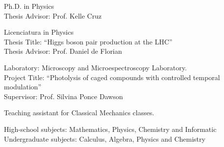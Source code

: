 \documentclass[10pt]{cv}
\begin{document}
\begin{llist}

Ph.D. in Physics\\
Thesis Advisor: Prof. Kelle Cruz

Licenciatura in Physics\\
Thesis Title: ``Higgs boson pair production at the LHC''\\
Thesis Advisor: Prof. Daniel de Florian

Laboratory: Microscopy and Microespectroscopy Laboratory. \\
Project Title: ``Photolysis of caged compounds with controlled temporal modulation'' \\
Supervisor: Prof. Silvina Ponce Dawson



Teaching assistant for Classical Mechanics classes.

High-school subjects: Mathematics, Physics, Chemistry and Informatic \\
Undergraduate subjects: Calculus, Algebra, Physics and Chemistry


\renewcommand{\labelenumi}{B\theenumi}
\begin{etaremune}[leftmargin=10pt]


\end{etaremune}
\end{llist}
\end{document}
